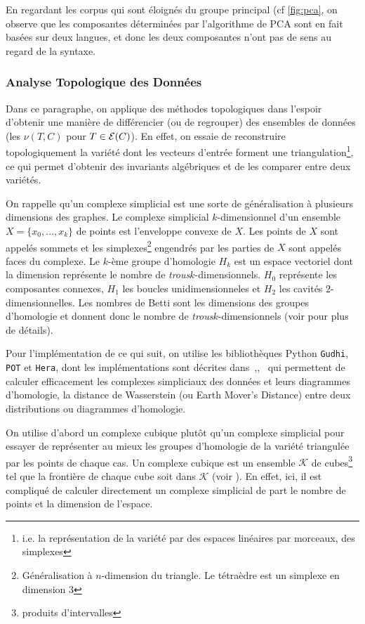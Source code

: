 \documentclass{cours}
\begin{document}
En regardant les corpus qui sont éloignés du groupe principal (cf \ref{fig:pca}, on observe que les composantes déterminées par l'algorithme de PCA sont en fait basées sur deux langues, et donc les deux composantes n'ont pas de sens au regard de la syntaxe.

\subsubsection{Analyse Topologique des Données}\label{subsub:tda}
Dans ce paragraphe, on applique des méthodes topologiques dans l'espoir d'obtenir une manière de différencier (ou de regrouper) des ensembles de données (les $\nu(T, C)$ pour $T\in \mathcal{E}(C)$).
En effet, on essaie de reconstruire topologiquement la variété dont les vecteurs d'entrée forment une triangulation\footnote{i.e. la représentation de la variété par des espaces linéaires par morceaux, des simplexes}, ce qui permet d'obtenir des invariants algébriques et de les comparer entre deux variétés.

On rappelle qu'un complexe simplicial est une sorte de généralisation à plusieurs dimensions des graphes. Le complexe simplicial $k$-dimensionnel d'un ensemble $X = \{x_{0}, \ldots, x_{k}\}$ de points est l'enveloppe convexe de $X$.
Les points de $X$ sont appelés sommets et les simplexes\footnote{Généralisation à $n$-dimension du triangle. Le tétraèdre est un simplexe en dimension $3$} engendrés par les parties de $X$ sont appelés faces du complexe.
Le $k$-ème groupe d'homologie $H_{k}$ est un espace vectoriel dont la dimension représente le nombre de \og\emph{ trous}\fg $k$-dimensionnels.
$H_{0}$ représente les composantes connexes, $H_{1}$ les boucles unidimensionneles et $H_{2}$ les cavités $2$-dimensionnelles.
Les nombres de Betti sont les dimensions des groupes d'homologie et donnent donc le nombre de \og\emph{trous}\fg $k$-dimensionnels (voir \cite{tldrtda} pour plus de détails).

Pour l'implémentation de ce qui suit, on utilise les bibliothèques Python \texttt{Gudhi}, \texttt{POT} et \texttt{Hera}, dont les implémentations sont décrites dans~\cite{Gudhi},\cite{PythonPOT},~\cite{Hera} qui permettent de calculer efficacement les complexes simpliciaux des données et leurs diagrammes d'homologie, la distance de Wasserstein (ou Earth Mover's Distance) entre deux distributions ou diagrammes d'homologie.

On utilise d'abord un complexe cubique plutôt qu'un complexe simplicial pour essayer de représenter au mieux les groupes d'homologie de la variété triangulée par les points de chaque cas.
Un complexe cubique est un ensemble $\mathcal{K}$ de cubes\footnote{produits d'intervalles} tel que la frontière de chaque cube soit dans $\mathcal{K}$ (voir \cite{cubicalhomology}).
En effet, ici, il est compliqué de calculer directement un complexe simplicial de part le nombre de points et la dimension de l'espace.
\end{document}
